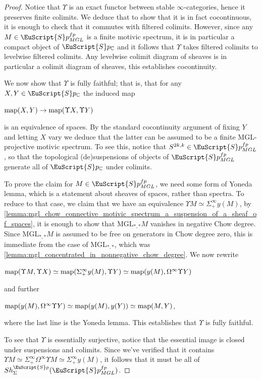 \documentclass[oneside,a4paper]{amsart}
\newcommand{\euscr}[1]{\EuScript{#1}} %
\newcommand{\map}{\textnormal{map}} %
\newcommand{\MGL}{\mathrm{MGL}} %
\newcommand{\spectra}{\euscr{S}p} %
\newcommand{\cspectra}{\euscr{S}p_{\mathbb{C}}} %
\newcommand{\spectramglfp}{\spectra_{MGL}^{fp}} %
\theoremstyle{plain}
\theoremstyle{definition}
\theoremstyle{remark}
\begin{document}
\begin{proof}
Notice that $\Upsilon$ is an exact functor between stable $\infty$-categories, hence it preserves finite colimits. We deduce that to show that it is in fact cocontinuous, it is enough to check that it commutes with filtered colimits. However, since any $M \in \spectramglfp$ is a finite motivic spectrum, it is in particular a compact object of $\cspectra$ and it follows that $\Upsilon$ takes filtered colimits to levelwise filtered colimits. Any levelwise colimit diagram of sheaves is in particular a colimit diagram of sheaves, this establishes cocontinuity. 

We now show that $\Upsilon$ is fully faithful; that is, that for any $X, Y \in \cspectra$ the induced map

\begin{center}
$\map(X, Y) \rightarrow \map(\Upsilon X, \Upsilon Y)$
\end{center}
is an equivalence of spaces. By the standard cocontinuity argument of fixing $Y$ and letting $X$ vary we deduce that the latter can be assumed to be a finite $\MGL$-projective motivic spectrum. To see this, notice that $S^{2k, k} \in \spectramglfp$, so that the topological (de)suspensions of objects of $\spectramglfp$ generate all of $\cspectra$ under colimits. 

To prove the claim for $M \in \spectramglfp$, we need some form of Yoneda lemma, which is a statement about sheaves of spaces, rather than spectra. To reduce to that case, we claim that we have an equivalence $\Upsilon M \simeq \Sigma^{\infty}_{+} y(M)$, by \cref{lemma:mgl_chow_connective_motivic_spectrum_a_suspension_of_a_sheaf_of_spaces}, it is enough to show that $\MGL_{*, *} M$ vanishes in negative Chow degree. Since $\MGL_{*, *} M$ is assumed to be free on generators in Chow degree zero, this is immediate from the case of $\MGL_{*, *}$, which was \cref{lemma:mgl_concentrated_in_nonnegative_chow_degree}. We now rewrite

\begin{center}
$\map(\Upsilon M, \Upsilon X) \simeq \map(\Sigma^{\infty}_{+} y(M), \Upsilon Y) \simeq \map(y(M), \Omega^{\infty} \Upsilon Y)$
\end{center}
and further 

\begin{center}
$\map(y(M), \Omega^{\infty} \Upsilon Y) \simeq \map(y(M), y(Y)) \simeq \map(M, Y)$,
\end{center}
where the last line is the Yoneda lemma. This establishes that $\Upsilon$ is fully faithful.

To see that $\Upsilon$ is essentially surjective, notice that the essential image is closed under suspensions and colimits. Since we've verified that it contains $\Upsilon M \simeq \Sigma^{\infty}_{+} \Omega^{\infty} \Upsilon M \simeq \Sigma^{\infty}_{+} y(M)$, it follows that it must be all of $Sh_{\Sigma}^{\spectra}(\spectramglfp)$. 
\end{proof}
\end{document}
